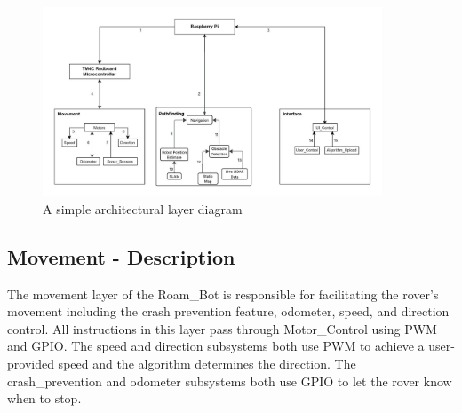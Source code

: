 
\begin{figure}[h!]
	\centering
 	\includegraphics[width=0.90\textwidth]{images/data_flow_2nd.jpeg}
 \caption{A simple architectural layer diagram} %
\end{figure}

\subsection{Movement - Description}
The movement layer of the Roam\_Bot is responsible for facilitating the rover's movement including the crash prevention feature, odometer, speed, and direction control. All instructions in this layer pass through Motor\_Control using PWM and GPIO. The speed and direction subsystems both use PWM to achieve a user-provided speed and the algorithm determines the direction. The crash\_prevention and odometer subsystems both use GPIO to let the rover know when to stop.

